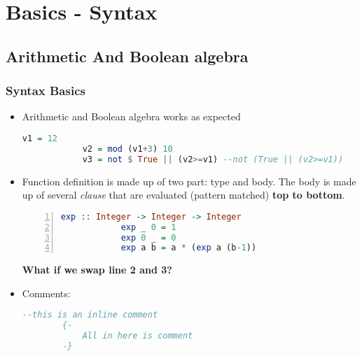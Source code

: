 	\section{Basics - Syntax}
	\frame{\sectionpage}
	
	\subsection{Arithmetic And Boolean algebra}
	
	\begin{frame}[fragile]\frametitle{Syntax Basics}
	\begin{itemize}
	\item Arithmetic and Boolean algebra works as expected
	\begin{lstlisting}[language=Haskell,basicstyle=\footnotesize\ttfamily]
			v1 = 12
			v2 = mod (v1+3) 10 
			v3 = not $ True || (v2>=v1) --not (True || (v2>=v1))
	\end{lstlisting}
	\pause
	\item Function definition is made up of two part: type and body. The body is
	made up of several \emph{clause} that are evaluated (pattern matched)
	\textbf{top to bottom}.
	\begin{lstlisting}[language=Haskell,basicstyle=\footnotesize\ttfamily,
	numbers=left] exp :: Integer -> Integer -> Integer
			exp _ 0 = 1
			exp 0 _ = 0
			exp a b = a * (exp a (b-1)) 
	\end{lstlisting}
	\textbf{What if we swap line 2 and 3?}
	\pause		
	\item Comments:
	 \begin{lstlisting}[language=Haskell,basicstyle=\footnotesize\ttfamily]
		--this is an inline comment
		{-
			All in here is comment
		-}				
	\end{lstlisting}
	\end{itemize}
	\end{frame}
	
	
